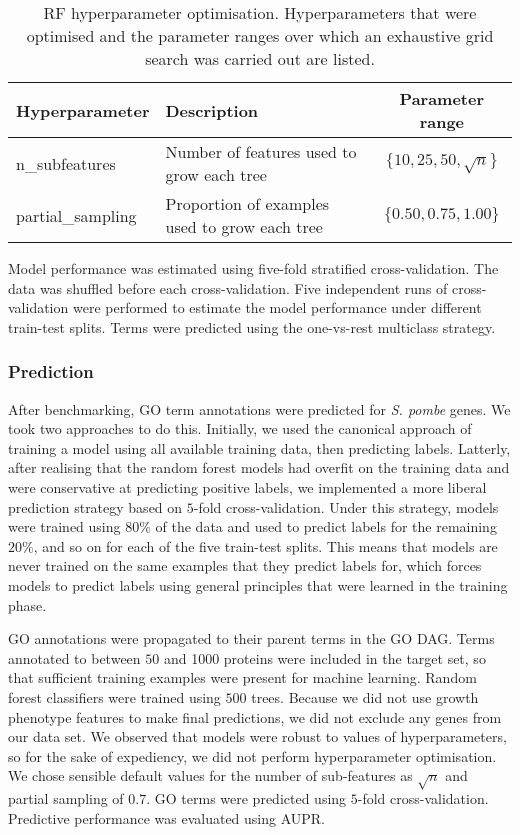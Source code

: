 \begin{table}[hbt!]
    \centering
    \caption{%
        RF hyperparameter optimisation.
        Hyperparameters that were optimised and the parameter ranges over which an exhaustive grid search was carried out are listed.
    }
    \label{tab:hyperparameter-grid}
    \begin{tabular}{llc}
        \toprule
        \textbf{Hyperparameter} & \textbf{Description} & \textbf{Parameter range} \\
        \midrule
        n\_subfeatures & Number of features used to grow each tree & $\{10, 25, 50, \sqrt{n} \} $ \\
        partial\_sampling & Proportion of examples used to grow each tree & $\{0.50, 0.75, 1.00\} $ \\
        \bottomrule
    \end{tabular}
\end{table}

Model performance was estimated using five-fold stratified cross-validation. The data was shuffled before each cross-validation. Five independent runs of cross-validation were performed to estimate the model performance under different train-test splits. Terms were predicted using the one-vs-rest multiclass strategy.

\subsubsection{Prediction}
\label{sec:rf-prediction}

After benchmarking, GO term annotations were predicted for \emph{S. pombe} genes. We took two approaches to do this. Initially, we used the canonical approach of training a model using all available training data, then predicting labels. Latterly, after realising that the random forest models had overfit on the training data and were conservative at predicting positive labels, we implemented a more liberal prediction strategy based on $5$-fold cross-validation. Under this strategy, models were trained using $80\%$ of the data and used to predict labels for the remaining $20\%$, and so on for each of the five train-test splits. This means that models are never trained on the same examples that they predict labels for, which forces models to predict labels using general principles that were learned in the training phase.

GO annotations were propagated to their parent terms in the GO DAG. Terms annotated to between $50$ and \num{1000} proteins were included in the target set, so that sufficient training examples were present for machine learning. Random forest classifiers were trained using $500$ trees. Because we did not use growth phenotype features to make final predictions, we did not exclude any genes from our data set. We observed that models were robust to values of hyperparameters, so for the sake of expediency, we did not perform hyperparameter optimisation. We chose sensible default values for the number of sub-features as $\sqrt{n}$ and partial sampling of $0.7$. GO terms were predicted using $5$-fold cross-validation. Predictive performance was evaluated using AUPR.


